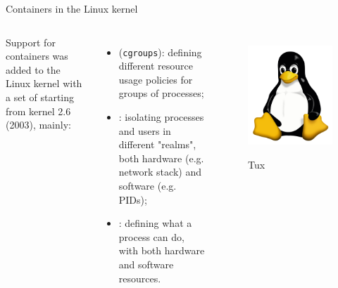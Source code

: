 \begin{frame}{Containers in the Linux kernel}
\begin{columns}
  Support for containers was added to the Linux kernel with a set of  starting from kernel 2.6 (2003), mainly:
  \begin{itemize}
    \item {} (\texttt{cgroups}): defining different resource usage policies for groups of processes;
    \item {}: isolating processes and users in different "realms", both hardware (e.g. network stack) and software (e.g. PIDs);
    \item {}: defining what a process can do, with both hardware and software resources.
  \end{itemize}

  \begin{figure}
    \centering
    \includegraphics[scale=.2]{tux.png}
    \label{fig:tux}
    \caption{Tux}
  \end{figure}
\end{columns}
\end{frame}
